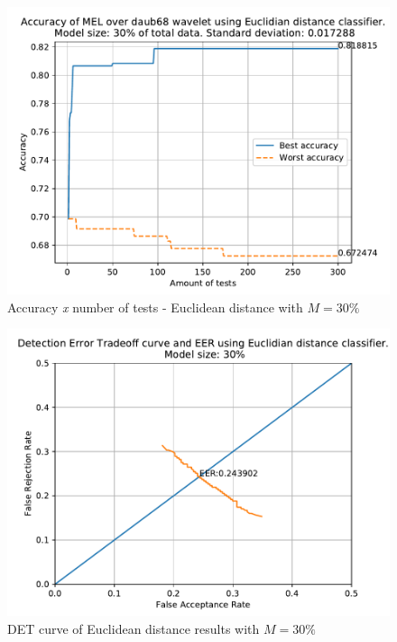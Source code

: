 	
		\begin{figure}[H]
			\centering
			\includegraphics[scale=.8]{images/results/confusionMatrices/classifier_Euclidian_30.pdf}
			\caption{Accuracy \textit{x} number of tests - Euclidean distance with $M=30\%$}
			\label{fig:classifiereuclidian30}
		\end{figure}
		\begin{figure}[H]
			\centering
			\includegraphics[scale=.8]{images/results/det/DET_for_classifier_Euclidian_30.pdf}
			\caption{DET curve of Euclidean distance results with $M=30\%$}
			\label{fig:detforclassifiereuclidian30}
		\end{figure}
	
